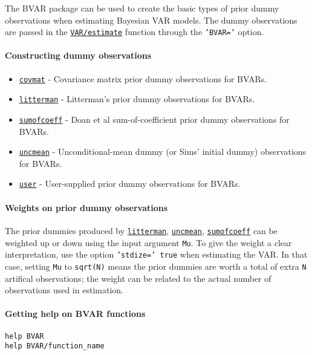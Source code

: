 

	The BVAR package can be used to create the basic types of prior dummy
observations when estimating Bayesian VAR models. The dummy observations
are passed in the \href{VAR/estimate}{\texttt{VAR/estimate}} function
through the \texttt{'BVAR='} option.

\paragraph{Constructing dummy
observations}\label{constructing-dummy-observations}

\begin{itemize}
\itemsep1pt\parskip0pt
\item
  \href{BVAR/covmat}{\texttt{covmat}} - Covariance matrix prior dummy
  observations for BVARs.
\item
  \href{BVAR/litterman}{\texttt{litterman}} - Litterman's prior dummy
  observations for BVARs.
\item
  \href{BVAR/sumofcoeff}{\texttt{sumofcoeff}} - Doan et al
  sum-of-coefficient prior dummy observations for BVARs.
\item
  \href{BVAR/uncmean}{\texttt{uncmean}} - Unconditional-mean dummy (or
  Sims' initial dummy) observations for BVARs.
\item
  \href{BVAR/user}{\texttt{user}} - User-supplied prior dummy
  observations for BVARs.
\end{itemize}

\paragraph{Weights on prior dummy
observations}\label{weights-on-prior-dummy-observations}

The prior dummies produced by \href{BVAR/litterman}{\texttt{litterman}},
\href{BVAR/uncmean}{\texttt{uncmean}},
\href{BVAR/sumofcoeff}{\texttt{sumofcoeff}} can be weighted up or down
using the input argument \texttt{Mu}. To give the weight a clear
interpretation, use the option \texttt{'stdize=' true} when estimating
the VAR. In that case, setting \texttt{Mu} to \texttt{sqrt(N)} means the
prior dummies are worth a total of extra \texttt{N} artifical
observations; the weight can be related to the actual number of
observations used in estimation.

\paragraph{Getting help on BVAR
functions}\label{getting-help-on-bvar-functions}

\begin{verbatim}
help BVAR
help BVAR/function_name
\end{verbatim}



